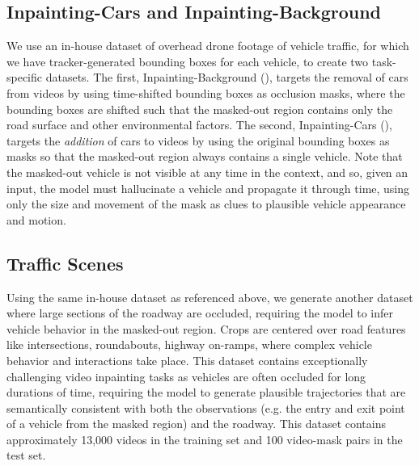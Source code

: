\subsection{Inpainting-Cars and Inpainting-Background}
We use an in-house dataset of overhead drone footage of vehicle traffic, for which we have tracker-generated bounding boxes for each vehicle, to create two task-specific datasets. The first, Inpainting-Background (), targets the removal of cars from videos by using time-shifted bounding boxes as occlusion masks, where the bounding boxes are shifted such that the masked-out region contains only the road surface and other environmental factors. The second, Inpainting-Cars (), targets the \emph{addition} of cars to videos by using the original bounding boxes as masks so that the masked-out region always contains a single vehicle. Note that the masked-out vehicle is not visible at any time in the context, and so,  given an input, the model must hallucinate a vehicle and propagate it through time, using only the size and movement of the mask as clues to plausible vehicle appearance and motion.
\subsection{Traffic Scenes}
Using the same in-house dataset as referenced above, we generate another dataset where large sections of the roadway are occluded, requiring the model to infer vehicle behavior in the masked-out region. Crops are centered over road features like intersections, roundabouts, highway on-ramps, \etc where complex vehicle behavior and interactions take place. This dataset contains exceptionally challenging video inpainting tasks as vehicles are often occluded for long durations of time, requiring the model to generate plausible trajectories that are semantically consistent with both the observations (e.g. the entry and exit point of a vehicle from the masked region) and the roadway. This dataset contains approximately 13,000 videos in the training set and 100 video-mask pairs in the test set. 
